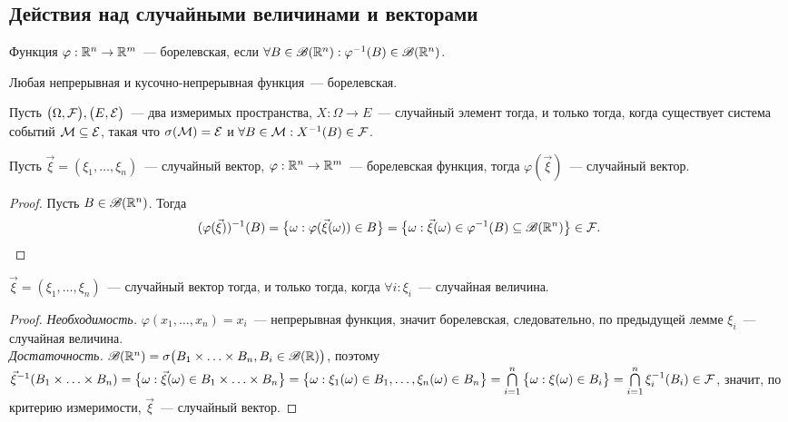 \subsection{Действия над случайными величинами и векторами}
\begin{definition}
	Функция $\varphi: \mathbb{R}^n \rightarrow \mathbb{R}^m$~--- борелевская, если $\forall B \in \mathscr{B}(\mathbb{R}^n): \varphi^{-1}(B) \in \mathscr{B}(\mathbb{R}^n)$. 
\end{definition}
\begin{statement}
	Любая непрерывная и кусочно-непрерывная функция~--- борелевская.
\end{statement}
\begin{theorem}
	Пусть $\big(\Omega, \mathcal{F}\big), \big(E, \mathcal{E}\big)$~--- два измеримых пространства, $X: \Omega \rightarrow E$~--- случайный элемент тогда, и только тогда, когда существует система событий $\mathcal{M} \subseteq \mathcal{E}$, такая что $\sigma(\mathcal{M}) = \mathcal{E}$ и $\forall B \in \mathcal{M}: X^{-1}(B) \in \mathcal{F}$.
\end{theorem}
\begin{lemma}
	Пусть $\vec\xi = (\xi_1, \ldots, \xi_n)$~--- случайный вектор, $\varphi: \mathbb{R}^n \rightarrow \mathbb{R}^m$~--- борелевская функция, тогда $\varphi(\vec\xi)$~--- случайный вектор.
	\begin{proof}
		Пусть $B \in \mathscr{B}(\mathbb{R}^n)$. Тогда 
		$$ (\varphi(\vec\xi))^{-1}(B) = \big\{\omega : \varphi(\vec\xi(\omega)) \in B\big\} = \big\{\omega : \vec\xi(\omega) \in \varphi^{-1}(B) \subseteq \mathscr{B}(\mathbb{R}^n) \big\} \in \mathcal{F}. $$
	\end{proof}
\end{lemma}
\begin{lemma}
	$\vec \xi = (\xi_1, \ldots, \xi_n)$~--- случайный вектор тогда, и только тогда, когда $\forall i : \xi_i$~--- случайная величина.
	\begin{proof}
		\emph{Необходимость.} $\varphi(x_1, \ldots, x_n) = x_i$~--- непрерывная функция, значит борелевская, следовательно, по предыдущей лемме $\xi_i$~--- случайная величина. \\
		\emph{Достаточность.} $\mathscr{B}(\mathbb{R}^n) = \sigma\big(B_1 \times \ldots \times B_n, B_i \in \mathscr{B}(\mathbb{R})\big)$, поэтому $\vec\xi^{-1}(B_1 \times \ldots \times B_n) = \big\{\omega : \vec\xi(\omega) \in B_1 \times \ldots \times B_n\big\} = \big\{\omega : \xi_1(\omega) \in B_1, \ldots, \xi_n(\omega) \in B_n\big\} = \bigcap\limits_{i = 1}^n\big\{\omega: \xi(\omega) \in B_i \big\} = \bigcap\limits_{i = 1}^n \xi_i^{-1}(B_i) \in \mathcal{F}$, значит, по критерию измеримости, $\vec \xi$~--- случайный вектор.
	\end{proof}
\end{lemma}
